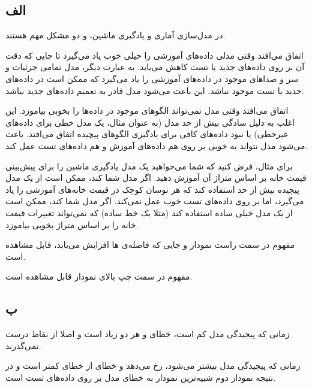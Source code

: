 \subsection*{الف}

در مدل‌سازی آماری و یادگیری ماشین،
و
دو مشکل مهم هستند.


اتفاق می‌افتد وقتی مدلی داده‌های آموزشی را خیلی خوب یاد می‌گیرد تا جایی که دقت آن بر روی داده‌های جدید یا تست کاهش می‌یابد. به عبارت دیگر، مدل تمامی جزئیات و سر و صداهای موجود در داده‌های آموزشی را یاد می‌گیرد که ممکن است در داده‌های جدید یا تست موجود نباشد. این باعث می‌شود مدل قادر به تعمیم داده‌های جدید نباشد.

اتفاق می‌افتد وقتی مدل نمی‌تواند الگوهای موجود در داده‌ها را بخوبی بیاموزد. این اغلب به دلیل سادگی بیش از حد مدل (به عنوان مثال، یک مدل خطی برای داده‌های غیرخطی) یا نبود داده‌های کافی برای یادگیری الگوهای پیچیده اتفاق می‌افتد. 
باعث می‌شود مدل نتواند به خوبی بر روی هم داده‌های آموزش و هم داده‌های تست عمل کند.

برای مثال، فرض کنید که شما می‌خواهید یک مدل یادگیری ماشین را برای پیش‌بینی قیمت خانه بر اساس متراژ آن آموزش دهید. اگر مدل شما
کند، ممکن است از یک مدل پیچیده بیش از حد استفاده کند که هر نوسان کوچک در قیمت خانه‌های آموزشی را یاد می‌گیرد، اما بر روی داده‌های تست خوب عمل نمی‌کند. اگر مدل شما
کند، ممکن است از یک مدل خیلی ساده استفاده کند (مثلا یک خط ساده) که نمی‌تواند تغییرات قیمت خانه را بر اساس متراژ بخوبی بیاموزد.

مفهوم 
در سمت راست نمودار و جایی که فاصله‌ی
ها افزایش می‌یابد، قابل مشاهده است.

مفهوم 
در سمت چپ بالای نمودار قابل مشاهده است.

\subsection*{ب}

زمانی که پیجیدگی مدل کم است، خطای 
و
هر دو زیاد است و اصلا از نقاط درست نمی‌گذرند.

زمانی که پیجیدگی مدل بیشتر می‌شود،
رخ می‌دهد و خطای
از خطای
کمتر است و در نتیجه نمودار دوم شبیه‌ترین نمودار به خطای مدل بر روی داده‌های تست است.